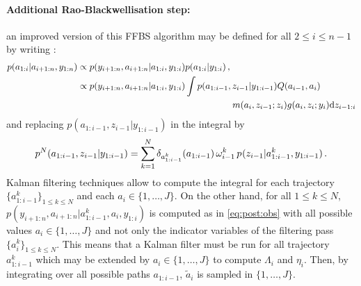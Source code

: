 \paragraph{Additional Rao-Blackwellisation step:}
an improved version of this FFBS algorithm may be defined for all $2\le i\le n-1$ by writing :
\begin{align*}
p(a_{1:i}|a_{i+1:n},y_{1:n}) &\propto p(y_{i+1:n},a_{i+1:n}|a_{1:i},y_{1:i})p(a_{1:i}|y_{1:i})\eqsp,\\
&\propto p(y_{i+1:n},a_{i+1:n}|a_{1:i},y_{1:i})\int p(a_{1:i-1},z_{i-1}|y_{1:i-1})Q(a_{i-1},a_i)\\
&\hspace{6cm}m(a_i,z_{i-1};z_i)g(a_i,z_i;y_i)\rmd z_{i-1:i}
\end{align*}
and replacing $p(a_{1:i-1},z_{i-1}|y_{1:i-1})$ in the integral by 
\[
p^N_{}(a_{1:i-1},z_{i-1}|y_{1:i-1}) = \sum_{k=1}^N\delta_{a^k_{1:i-1}}(a_{1:i-1})\,\omega^k_{i-1}\,p_{}(z_{i-1}|a^k_{1:i-1},y_{1:i-1})\,.
\]
Kalman filtering techniques allow to compute the integral for each trajectory $\{a^k_{1:i-1}\}_{1\le k\le N}$ and each $a_i\in\{1,\ldots,J\}$.
On the other hand, for all $1\le k \le N$, $p(y_{i+1:n},a_{i+1:n}|a^k_{1:i-1},a_i,y_{1:i})$ is computed as in \eqref{eq:post:obs} with all possible values $a_i\in\{1,\ldots,J\}$ and not only the indicator variables of the filtering pass $\{a_i^k\}_{1\le k \le N}$. This means that a Kalman filter must be run for all trajectory $a^k_{1:i-1}$ which may be extended by $a_i\in\{1,\ldots,J\}$ to compute $\Lambda_i$ and $\eta_i$. Then, by integrating over all possible paths $a_{1:i-1}$, $\tilde{a}_i$ is sampled in $\{1,\ldots,J\}$.

